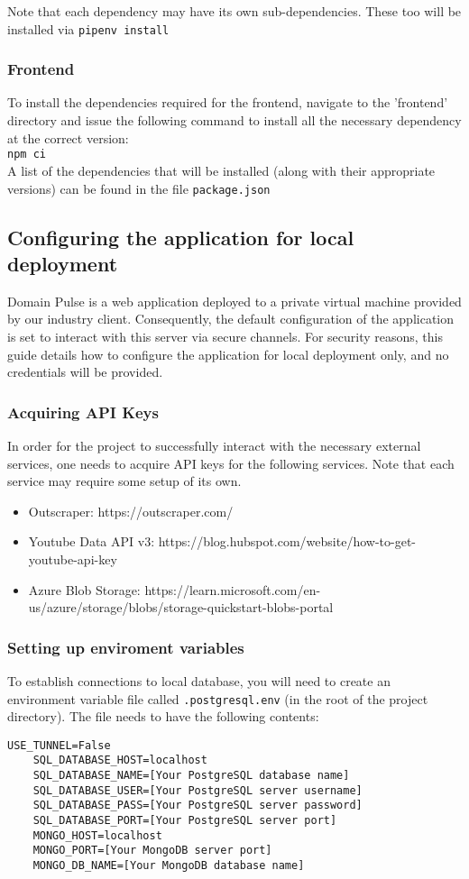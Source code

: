 \documentclass[12pt]{article}
\begin{document}
Note that each dependency may have its own sub-dependencies. These too will be installed via \texttt{pipenv install}

\subsubsection{Frontend}
To install the dependencies required for the frontend, navigate to the 'frontend' directory and issue the following command to install
all the necessary dependency at the correct version: \\
\texttt{npm ci}\\
A list of the dependencies that will be installed (along with their appropriate versions) can be found in the file \texttt{package.json}


\subsection{Configuring the application for local deployment}
Domain Pulse is a web application deployed to a private virtual machine provided by our industry client. Consequently, the default
configuration of the application is set to interact with this server via secure channels. For security reasons, this guide details how to configure
the application for local deployment only, and no credentials will be provided.

\subsubsection{Acquiring API Keys}
In order for the project to successfully interact with the necessary external services, one needs to acquire API keys for the following services.
Note that each service may require some setup of its own.
\begin{itemize}
    \item Outscraper: https://outscraper.com/
    \item Youtube Data API v3: https://blog.hubspot.com/website/how-to-get-youtube-api-key
    \item Azure Blob Storage: https://learn.microsoft.com/en-us/azure/storage/blobs/storage-quickstart-blobs-portal
\end{itemize}


\subsubsection{Setting up enviroment variables}
To establish connections to local database, you will need to create an environment variable file called \texttt{.postgresql.env} (in the root of the project directory). The file
needs to have the following contents:
\begin{lstlisting}[basicstyle=\ttfamily]
    USE_TUNNEL=False
    SQL_DATABASE_HOST=localhost
    SQL_DATABASE_NAME=[Your PostgreSQL database name]
    SQL_DATABASE_USER=[Your PostgreSQL server username]
    SQL_DATABASE_PASS=[Your PostgreSQL server password]
    SQL_DATABASE_PORT=[Your PostgreSQL server port]
    MONGO_HOST=localhost
    MONGO_PORT=[Your MongoDB server port]
    MONGO_DB_NAME=[Your MongoDB database name]
\end{lstlisting}
\end{document}
